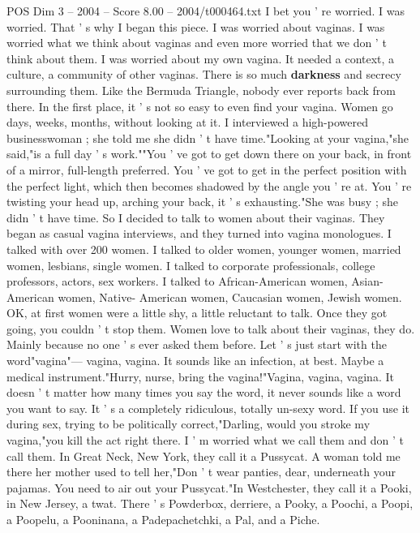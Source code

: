 \begin{textsample}{POS Dim 3 – 2004 – Score 8.00 – 2004/t000464.txt}  \label{ex:f3_pos_070}
I bet you ' re worried.
I was worried.
That ' s why I began this piece.
I was worried about vaginas.
I was worried what we think about vaginas and even more worried that we don ' t think about them.
I was worried about my own vagina.
It needed a context, a culture, a community of other vaginas.
There is so much \textbf{darkness} and secrecy surrounding them.
Like the Bermuda Triangle, nobody ever reports back from there.
In the first place, it ' s not so easy to even find your vagina.
Women go days, weeks, months, without looking at it.
I interviewed a high-powered businesswoman ; she told me she didn ' t have time."Looking at your vagina,"she said,"is a full day ' s work.""You ' ve got to get down there on your back, in front of a mirror, full-length preferred.
You ' ve got to get in the perfect position with the perfect light, which then becomes shadowed by the angle you ' re at.
You ' re twisting your head up, arching your back, it ' s exhausting."She was busy ; she didn ' t have time.
So I decided to talk to women about their vaginas.
They began as casual vagina interviews, and they turned into vagina monologues.
I talked with over 200 women.
I talked to older women, younger women, married women, lesbians, single women.
I talked to corporate professionals, college professors, actors, sex workers.
I talked to African-American women, Asian-American women, Native- American women, Caucasian women, Jewish women.
OK, at first women were a little shy, a little reluctant to talk.
Once they got going, you couldn ' t stop them.
Women love to talk about their vaginas, they do.
Mainly because no one ' s ever asked them before.
Let ' s just start with the word"vagina"— vagina, vagina.
It sounds like an infection, at best.
Maybe a medical instrument."Hurry, nurse, bring the vagina!"Vagina, vagina, vagina.
It doesn ' t matter how many times you say the word, it never sounds like a word you want to say.
It ' s a completely ridiculous, totally un-sexy word.
If you use it during sex, trying to be politically correct,"Darling, would you stroke my vagina,"you kill the act right there.
I ' m worried what we call them and don ' t call them.
In Great Neck, New York, they call it a Pussycat.
A woman told me there her mother used to tell her,"Don ' t wear panties, dear, underneath your pajamas.
You need to air out your Pussycat."In Westchester, they call it a Pooki, in New Jersey, a twat.
There ' s Powderbox, derriere, a Pooky, a Poochi, a Poopi, a Poopelu, a Pooninana, a Padepachetchki, a Pal, and a Piche.

\end{textsample}
